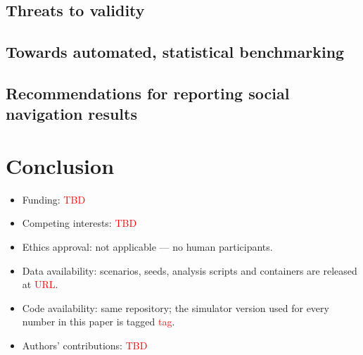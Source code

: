 \documentclass[pdflatex,sn-mathphys-num]{template/sn-jnl}%
\newcommand{\tbd}[1][TBD]{\textcolor{red}{#1}}
\newcommand{\ph}[1]{\textcolor{red}{\langle #1\rangle}}
\begin{document}
\subsection{Threats to validity}
\label{sec:discussion:threats}

\subsection{Towards automated, statistical benchmarking}
\label{sec:discussion:roadmap}

\subsection{Recommendations for reporting social navigation results}
\label{sec:discussion:reporting}

\section{Conclusion}
\label{sec:conclusion}


\begin{itemize}
  \item Funding: \tbd
  \item Competing interests: \tbd
  \item Ethics approval: not applicable --- no human participants.
  \item Data availability: scenarios, seeds, analysis scripts and containers
        are released at \ph{URL}.
  \item Code availability: same repository; the simulator version used for
        every number in this paper is tagged \ph{tag}.
  \item Authors' contributions: \tbd
\end{itemize}
\end{document}
